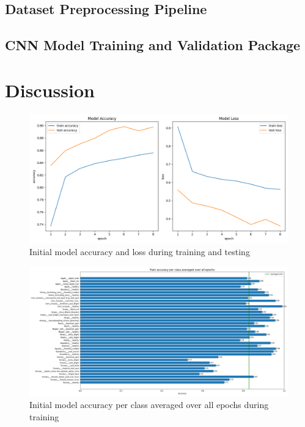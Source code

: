 \documentclass{BachelorBUI}
\begin{document}
    \subsection{Dataset Preprocessing Pipeline}
    \subsection{CNN Model Training and Validation Package}


\section{Discussion}
    \begin{figure}[h]
        \centering
        \includegraphics[width=\textwidth]{initial_accuracy_and_loss_2024-11-25_07.55.35.png}
        \caption{\centering Initial model accuracy and loss during training and testing}
        \label{fig:initial_accuracy_and_loss}
    \end{figure}
    \begin{figure}[h]
        \centering
        \includegraphics[width=\textwidth]{initial_train_accuracy_per_class_2024-11-25_07.55.35.png}
        \caption{\centering Initial model accuracy per class averaged over all epochs during training}
        \label{fig:initial_train_accuracy_per_class}
    \end{figure}
\end{document}
